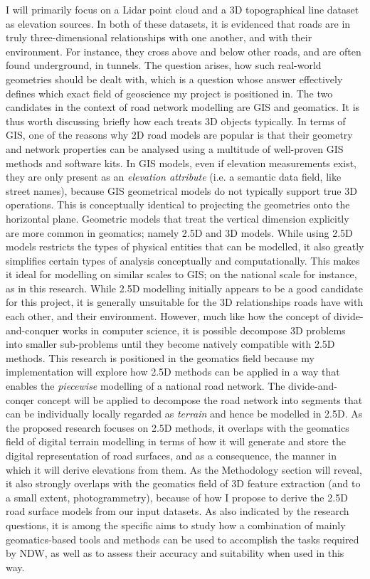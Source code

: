 I will primarily focus on a Lidar point cloud and a 3D topographical line dataset as elevation sources. In both of these datasets, it is evidenced that roads are in truly three-dimensional relationships with one another, and with their environment. For instance, they cross above and below other roads, and are often found underground, in tunnels. The question arises, how such real-world geometries should be dealt with, which is a question whose answer effectively defines which exact field of geoscience my project is positioned in. The two candidates in the context of road network modelling are GIS and geomatics. It is thus worth discussing briefly how each treats 3D objects typically. In terms of GIS, one of the reasons why 2D road models are popular is that their geometry and network properties can be analysed using a multitude of well-proven GIS methods and software kits. In GIS models, even if elevation measurements exist, they are only present as an \textit{elevation attribute} (i.e. a semantic data field, like street names), because GIS geometrical models do not typically support true 3D operations. This is conceptually identical to projecting the geometries onto the horizontal plane. Geometric models that treat the vertical dimension explicitly are more common in geomatics; namely 2.5D and 3D models. While using 2.5D models restricts the types of physical entities that can be modelled, it also greatly simplifies certain types of analysis conceptually and computationally. This makes it ideal for modelling on similar scales to GIS; on the national scale for instance, as in this research. While 2.5D modelling initially appears to be a good candidate for this project, it is generally unsuitable for the 3D relationships roads have with each other, and their environment. However, much like how the concept of divide-and-conquer works in computer science, it is possible decompose 3D problems into smaller sub-problems until they become natively compatible with 2.5D methods. This research is positioned in the geomatics field because my implementation will explore how 2.5D methods can be applied in a way that enables the \textit{piecewise} modelling of a national road network. The divide-and-conqer concept will be applied to decompose the road network into segments that can be individually locally regarded as \textit{terrain} and hence be modelled in 2.5D. As the proposed research focuses on 2.5D methods, it overlaps with the geomatics field of digital terrain modelling in terms of how it will generate and store the digital representation of road surfaces, and as a consequence, the manner in which it will derive elevations from them. As the Methodology section will reveal, it also strongly overlaps with the geomatics field of 3D feature extraction (and to a small extent, photogrammetry), because of how I propose to derive the 2.5D road surface models from our input datasets. As also indicated by the research questions, it is among the specific aims to study how a combination of mainly geomatics-based tools and methods can be used to accomplish the tasks required by NDW, as well as to assess their accuracy and suitability when used in this way.


